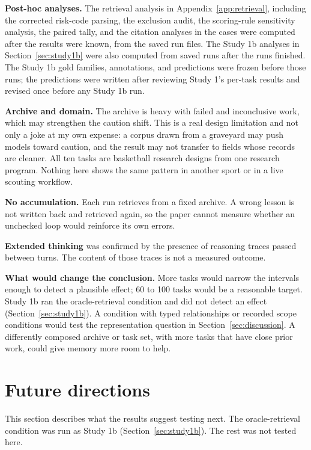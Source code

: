 \documentclass[11pt]{article}
\begin{document}
\textbf{Post-hoc analyses.} The retrieval analysis in Appendix~\ref{app:retrieval}, including the corrected risk-code parsing, the exclusion audit, the scoring-rule sensitivity analysis, the paired tally, and the citation analyses in the cases were computed after the results were known, from the saved run files. The Study 1b analyses in Section~\ref{sec:study1b} were also computed from saved runs after the runs finished. The Study 1b gold families, annotations, and predictions were frozen before those runs; the predictions were written after reviewing Study 1's per-task results and revised once before any Study 1b run.

\textbf{Archive and domain.} The archive is heavy with failed and inconclusive work, which may strengthen the caution shift. This is a real design limitation and not only a joke at my own expense: a corpus drawn from a graveyard may push models toward caution, and the result may not transfer to fields whose records are cleaner. All ten tasks are basketball research designs from one research program. Nothing here shows the same pattern in another sport or in a live scouting workflow.

\textbf{No accumulation.} Each run retrieves from a fixed archive. A wrong lesson is not written back and retrieved again, so the paper cannot measure whether an unchecked loop would reinforce its own errors.

\textbf{Extended thinking} was confirmed by the presence of reasoning traces passed between turns. The content of those traces is not a measured outcome.

\textbf{What would change the conclusion.} More tasks would narrow the intervals enough to detect a plausible effect; 60 to 100 tasks would be a reasonable target. Study 1b ran the oracle-retrieval condition and did not detect an effect (Section~\ref{sec:study1b}). A condition with typed relationships or recorded scope conditions would test the representation question in Section~\ref{sec:discussion}. A differently composed archive or task set, with more tasks that have close prior work, could give memory more room to help.

\section{Future directions}
\label{sec:future}

This section describes what the results suggest testing next. The oracle-retrieval condition was run as Study 1b (Section~\ref{sec:study1b}). The rest was not tested here.
\end{document}
